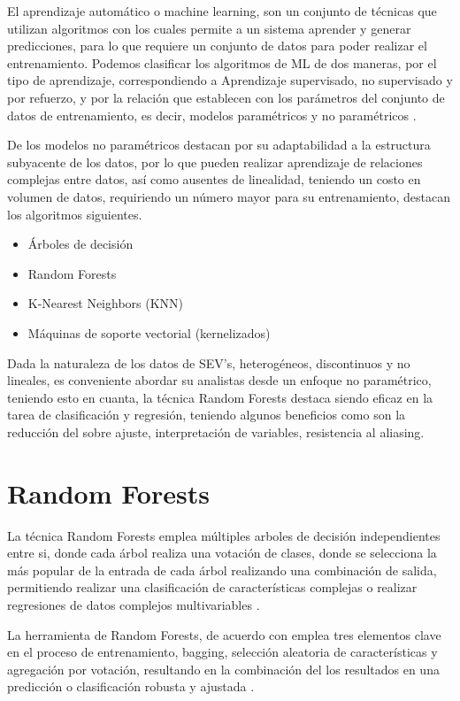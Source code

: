 	El aprendizaje automático o machine learning, son un conjunto de técnicas que utilizan algoritmos con los cuales permite a un sistema aprender y generar predicciones, para lo que requiere un conjunto de datos para poder realizar el entrenamiento. Podemos clasificar los algoritmos de ML de dos maneras, por el tipo de aprendizaje, correspondiendo a Aprendizaje supervisado, no supervisado y por refuerzo, y por la relación que establecen con los parámetros del conjunto de datos de entrenamiento, es decir, modelos paramétricos y no paramétricos \citep{li2024}. 
	
	De los modelos no paramétricos destacan por su adaptabilidad a la estructura subyacente de los datos, por lo que pueden realizar aprendizaje de relaciones complejas entre datos, así como ausentes de linealidad, teniendo un costo en volumen de datos, requiriendo un número mayor para su entrenamiento, destacan los algoritmos siguientes.
	
	\begin{itemize}
		\item Árboles de decisión
		\item Random Forests
		\item K-Nearest Neighbors (KNN)
		\item Máquinas de soporte vectorial (kernelizados)
	\end{itemize}
	
	Dada la naturaleza de los datos de SEV's, heterogéneos, discontinuos y no lineales, es conveniente abordar su analistas desde un enfoque no paramétrico, teniendo esto en cuanta, la técnica Random Forests destaca siendo eficaz en la tarea de clasificación y regresión, teniendo algunos beneficios como son la reducción del sobre ajuste, interpretación de variables, resistencia al aliasing.
	
	\section{Random Forests} 
	
		La técnica Random Forests emplea múltiples arboles de decisión independientes entre si, donde cada árbol realiza una votación de clases, donde se selecciona la más popular de la entrada de cada árbol realizando una combinación de salida, permitiendo realizar una clasificación de características complejas o realizar regresiones de datos complejos multivariables \citep{breiman2001, lan2020}.
		
		La herramienta de Random Forests, de acuerdo con \citet{breiman2001} emplea tres elementos clave en el proceso de entrenamiento, bagging, selección aleatoria de características y agregación por votación, resultando en la combinación del los resultados en una predicción o clasificación robusta y ajustada \citep{lan2020}.
		
